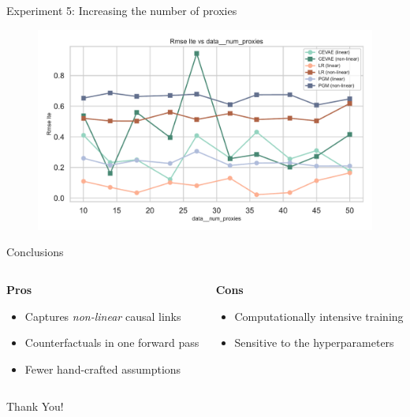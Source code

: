 \documentclass[10pt]{beamer}
\begin{document}
\begin{frame}{Experiment 5: Increasing the number of proxies}
    \begin{figure}[H]
      \includegraphics[width=\textwidth]{images/MyRun_data__num_proxies--rmse_ite.pdf}
    \end{figure}
\end{frame}


\begin{frame}{Conclusions}

\begin{columns}[T]
  \begin{column}{0.48\textwidth}
    \textbf{Pros}
    \begin{itemize}\setlength\itemsep{4pt}
      \item Captures \emph{non-linear} causal links
      \item Counterfactuals in one forward pass
      \item Fewer hand-crafted assumptions
    \end{itemize}
  \end{column}
  \begin{column}{0.48\textwidth}
    \textbf{Cons}
    \begin{itemize}\setlength\itemsep{4pt}
      \item Computationally intensive training
      \item Sensitive to the hyperparameters
    \end{itemize}
  \end{column}
\end{columns}

\end{frame}

{
\begin{frame}[standout]
\thispagestyle{empty}
  {\LARGE Thank You!}
\end{frame}
}
\end{document}
